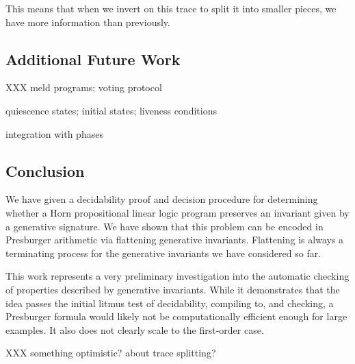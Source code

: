 \documentclass[fullpage, 11pt]{article}
\newcommand{\lolli}{\multimap}
\begin{document}
This means that when we invert on this trace to split it into smaller
pieces, we have more information than previously.


\subsection{Additional Future Work}

XXX meld programs; voting protocol

quiescence states; initial states; liveness conditions

% 

integration with phases

\subsection{Conclusion}

We have given a decidability proof and decision procedure for determining
whether a Horn propositional linear logic program preserves an invariant
given by a generative signature. We have shown that this problem can be
encoded in Presburger arithmetic via flattening generative invariants.
Flattening is always a terminating process for the generative invariants we
have considered so far.

This work represents a very preliminary investigation into the automatic
checking of properties described by generative invariants. While it
demonstrates that the idea passes the initial litmus test of decidability,
compiling to, and checking, a Presburger formula would likely not be
computationally efficient enough for large examples. It also does not
clearly scale to the first-order case. %

XXX something optimistic? about trace splitting?



\end{document}
